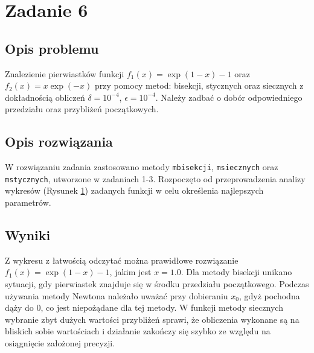 \documentclass{classrep}
\begin{document}
\section{Zadanie 6}
	\subsection{Opis problemu}
		Znalezienie pierwiastków funkcji $f_1(x)=\exp(1-x)-1$ oraz $f_2(x)=x\exp(-x)$ przy pomocy metod: bisekcji, stycznych oraz siecznych z dokładnością obliczeń $\delta=10^{-4}$, $\epsilon=10^{-4}$. Należy zadbać o dobór odpowiedniego przedziału oraz przybliżeń początkowych.
		
	\subsection{Opis rozwiązania}
		W rozwiązaniu zadania zastosowano metody \texttt{mbisekcji}, \texttt{msiecznych} oraz \texttt{mstycznych}, utworzone w zadaniach 1-3.
		Rozpoczęto od przeprowadzenia analizy wykresów (Rysunek \ref{fig:2}) zadanych funkcji w celu określenia najlepszych parametrów.
		
		\begin{figure}[!htbp]
			\centering
			 \hfill
  			\caption{}
  			\label{fig:2}
		\end{figure}		
		
	\subsection{Wyniki}
			Z wykresu z łatwością odczytać można prawidłowe rozwiązanie $f_1(x)=\exp(1-x)-1$, jakim jest $x=1.0$.
			Dla metody bisekcji unikano sytuacji, gdy pierwiastek znajduje się w środku przedziału początkowego. Podczas używania metody Newtona należało uważać przy dobieraniu $x_0$, gdyż pochodna dąży do $0$, co jest niepożądane dla tej metody. W funkcji metody siecznych wybranie zbyt dużych wartości przybliżeń sprawi, że obliczenia wykonane są na bliskich sobie wartościach i działanie zakończy się szybko ze względu na osiągnięcie założonej precyzji.
			\\
			
\end{document}
